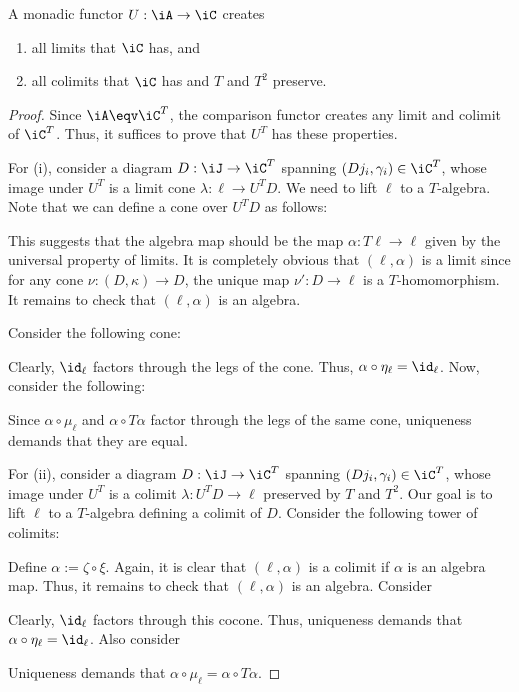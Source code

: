 \documentclass{amsart}
\begin{document}
\begin{thm}\label{thm:monadic-create-limits}
  A monadic functor $U : \iA \to \iC$ creates
  \begin{enumerate}
  \item all limits that $\iC$ has, and
  \item all colimits that $\iC$ has and $T$ and $T^{2}$ preserve.
  \end{enumerate}
\end{thm}
\begin{proof}
  Since $\iA \eqv \iC^{T}$, the comparison functor creates any limit and colimit of $\iC^{T}$.
  Thus, it suffices to prove that $U^{T}$ has these properties.
  
  For (i), consider a diagram $D : \iJ \to \iC^{T}$ spanning $(Dj_{i},\gamma_{i}) \in \iC^{T}$, whose image under $U^{T}$ is a limit cone $\lambda : \ell \to U^{T}D$.
  We need to lift $\ell$ to a $T$-algebra.
  Note that we can define a cone over $U^{T}D$ as follows:
  
  This suggests that the algebra map should be the map $\alpha : T\ell \to \ell$ given by the universal property of limits.
  It is completely obvious that $(\ell,\alpha)$ is a limit since for any cone $\nu : (D,\kappa) \to D$, the unique map $\nu' : D \to \ell$ is a $T$-homomorphism.
  It remains to check that $(\ell,\alpha)$ is an algebra.
  
  Consider the following cone:
  
  Clearly, $\id_{\ell}$ factors through the legs of the cone.
  Thus, $\alpha \circ \eta_{\ell} = \id_{\ell}$.
  Now, consider the following:
  
  Since $\alpha \circ \mu_{\ell}$ and $\alpha \circ T\alpha$ factor through the legs of the same cone, uniqueness demands that they are equal.

  For (ii), consider a diagram $D : \iJ \to \iC^{T}$ spanning $(Dj_{i},\gamma_{i}) \in \iC^{T}$, whose image under $U^{T}$ is a colimit $\lambda : U^{T}D \to \ell$ preserved by $T$ and $T^{2}$.
  Our goal is to lift $\ell$ to a $T$-algebra defining a colimit of $D$.
  Consider the following tower of colimits:
  
  Define $\alpha := \zeta \circ \xi$.
  Again, it is clear that $(\ell,\alpha)$ is a colimit if $\alpha$ is an algebra map.
  Thus, it remains to check that $(\ell,\alpha)$ is an algebra.
  Consider
  
  Clearly, $\id_{\ell}$ factors through this cocone.
  Thus, uniqueness demands that $\alpha \circ \eta_{\ell} = \id_{\ell}$.
  Also consider
  
  Uniqueness demands that $\alpha \circ \mu_{\ell} = \alpha \circ T\alpha$.
\end{proof}
\end{document}
